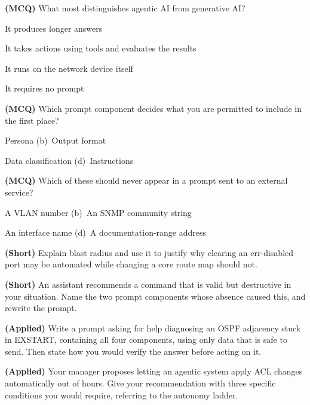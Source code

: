 \begin{reviewq}
  \item \textbf{(MCQ)} What most distinguishes agentic AI from generative AI?
        \begin{tight}
          \item[(a)] It produces longer answers
          \item[(b)] It takes actions using tools and evaluates the results
          \item[(c)] It runs on the network device itself
          \item[(d)] It requires no prompt
        \end{tight}
  \item \textbf{(MCQ)} Which prompt component decides what you are permitted to
        include in the first place?
        \begin{tight}
          \item[(a)] Persona \quad (b)~Output format
          \item[(c)] Data classification \quad (d)~Instructions
        \end{tight}
  \item \textbf{(MCQ)} Which of these should never appear in a prompt sent to an
        external service?
        \begin{tight}
          \item[(a)] A VLAN number \quad (b)~An SNMP community string
          \item[(c)] An interface name \quad (d)~A documentation-range address
        \end{tight}
  \item \textbf{(Short)} Explain blast radius and use it to justify why clearing
        an err-disabled port may be automated while changing a core route map
        should not.
  \item \textbf{(Short)} An assistant recommends a command that is valid but
        destructive in your situation. Name the two prompt components whose
        absence caused this, and rewrite the prompt.
  \item \textbf{(Applied)} Write a prompt asking for help diagnosing an OSPF
        adjacency stuck in EXSTART, containing all four components, using only
        data that is safe to send. Then state how you would verify the answer
        before acting on it.
  \item \textbf{(Applied)} Your manager proposes letting an agentic system apply
        ACL changes automatically out of hours. Give your recommendation with
        three specific conditions you would require, referring to the autonomy
        ladder.
\end{reviewq}

